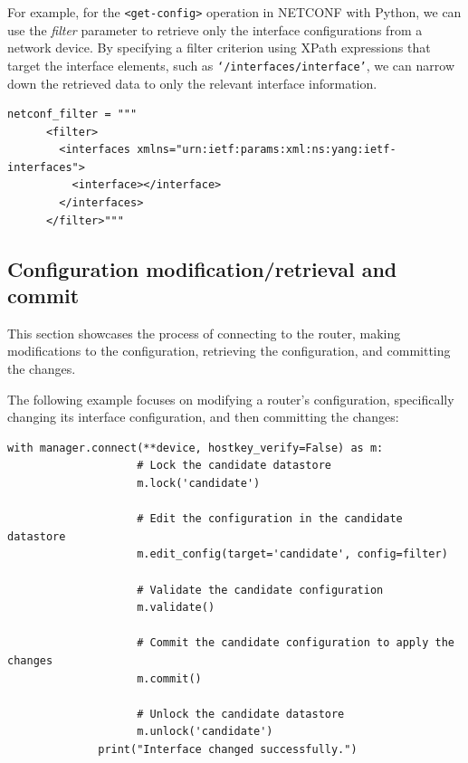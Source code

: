 For example, for the \texttt{<get-config>} operation in NETCONF with Python, we can use the \textit{filter} parameter to retrieve only the interface configurations from a network device. By specifying a filter criterion using XPath expressions that target the interface elements, such as \texttt{`/interfaces/interface'}, we can narrow down the retrieved data to only the relevant interface information.

\begin{lstlisting}[style=pythonStyle, caption={Filter for interfaces \cite{github}.}, backgroundcolor=\color{codebackground}]
  netconf_filter = """
      <filter>
        <interfaces xmlns="urn:ietf:params:xml:ns:yang:ietf-interfaces">
          <interface></interface>
        </interfaces>
      </filter>"""          
\end{lstlisting}

\subsection{Configuration modification/retrieval and commit}

This section showcases the process of connecting to the router, making modifications to the configuration, retrieving the configuration, and committing the changes.

The following example focuses on modifying a router's configuration, specifically changing its interface configuration, and then committing the changes:
\begin{lstlisting}[style=pythonStyle, caption={Changing the interface \cite{github}.}, backgroundcolor=\color{codebackground}]
              with manager.connect(**device, hostkey_verify=False) as m:
                    # Lock the candidate datastore
                    m.lock('candidate')

                    # Edit the configuration in the candidate datastore
                    m.edit_config(target='candidate', config=filter)

                    # Validate the candidate configuration
                    m.validate()

                    # Commit the candidate configuration to apply the changes
                    m.commit()

                    # Unlock the candidate datastore
                    m.unlock('candidate')
              print("Interface changed successfully.")          
\end{lstlisting}

